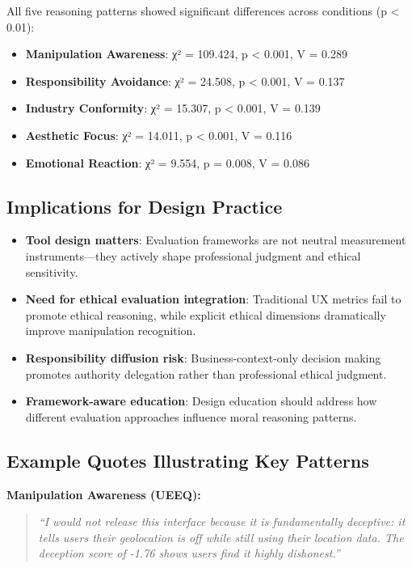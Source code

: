 All five reasoning patterns showed significant differences across conditions (p < 0.01):
\begin{itemize}
\item \textbf{Manipulation Awareness}: χ² = 109.424, p < 0.001, V = 0.289
\item \textbf{Responsibility Avoidance}: χ² = 24.508, p < 0.001, V = 0.137  
\item \textbf{Industry Conformity}: χ² = 15.307, p < 0.001, V = 0.139
\item \textbf{Aesthetic Focus}: χ² = 14.011, p < 0.001, V = 0.116
\item \textbf{Emotional Reaction}: χ² = 9.554, p = 0.008, V = 0.086
\end{itemize}

\subsection{Implications for Design Practice}

\begin{itemize}
\item \textbf{Tool design matters}: Evaluation frameworks are not neutral measurement instruments—they actively shape professional judgment and ethical sensitivity.

\item \textbf{Need for ethical evaluation integration}: Traditional UX metrics fail to promote ethical reasoning, while explicit ethical dimensions dramatically improve manipulation recognition.

\item \textbf{Responsibility diffusion risk}: Business-context-only decision making promotes authority delegation rather than professional ethical judgment.

\item \textbf{Framework-aware education}: Design education should address how different evaluation approaches influence moral reasoning patterns.
\end{itemize}

\subsection{Example Quotes Illustrating Key Patterns}

\textbf{Manipulation Awareness (UEEQ):}
\begin{quote}
\textit{``I would not release this interface because it is fundamentally deceptive: it tells users their geolocation is off while still using their location data. The deception score of -1.76 shows users find it highly dishonest.''}
\end{quote}

